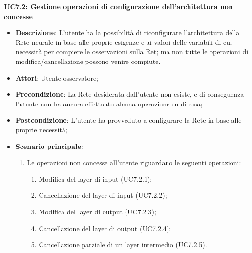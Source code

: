\textbf{UC7.2: Gestione operazioni di configurazione dell'architettura non concesse}
\label{UC7.2: Gestione operazioni di configurazione dell'architettura non concesse}
\noindent
\begin{itemize}
\item \textbf{Descrizione}: L'utente ha la possibilit\`a di riconfigurare l'architettura della Rete neurale in base alle proprie esigenze e ai valori delle variabili di cui necessit\`a per compiere le osservazioni sulla Ret; ma non tutte le operazioni di modifica/cancellazione possono venire compiute.
\item \textbf{Attori}: Utente osservatore;
\item \textbf{Precondizione}: La Rete desiderata dall'utente non esiste, e di conseguenza l'utente non ha ancora effettuato alcuna operazione su di essa;
\item \textbf{Postcondizione}: L'utente ha provveduto a configurare la Rete in base alle proprie necessit\`a;
\item \textbf{Scenario principale}:
\begin{enumerate}
\item Le operazioni non concesse all'utente riguardano le seguenti operazioni:
\begin{enumerate}
\item Modifica del layer di input (UC7.2.1);
\item Cancellazione del layer di input (UC7.2.2);
\item Modifica del layer di output (UC7.2.3);
\item Cancellazione del layer di output (UC7.2.4);
\item Cancellazione parziale di un layer intermedio (UC7.2.5).
\end{enumerate}
\end{enumerate}
\end{itemize}

